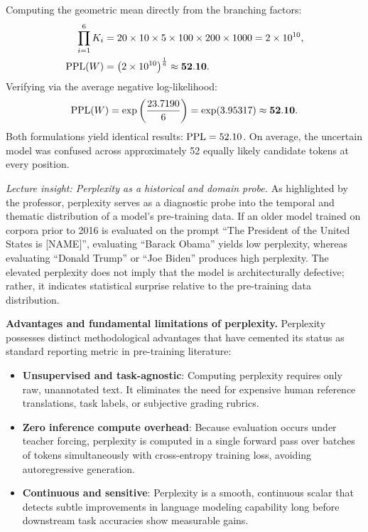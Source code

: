 \documentclass[../../main.tex]{subfiles}
\begin{document}
Computing the geometric mean directly from the branching factors:
\begin{align}
\prod_{i=1}^6 K_i &= 20 \times 10 \times 5 \times 100 \times 200 \times 1000 = 2 \times 10^{10}, \\
\mathrm{PPL}(W) &= \left( 2 \times 10^{10} \right)^{\frac{1}{6}} \approx \mathbf{52.10}.
\end{align}
Verifying via the average negative log-likelihood:
\begin{equation}
\mathrm{PPL}(W) = \exp\left( \frac{23.7190}{6} \right) = \exp(3.95317) \approx \mathbf{52.10}.
\end{equation}
Both formulations yield identical results: $\mathrm{PPL} = 52.10$. On average, the uncertain model was confused across approximately 52 equally likely candidate tokens at every position.

\textit{Lecture insight: Perplexity as a historical and domain probe.} As highlighted by the professor, perplexity serves as a diagnostic probe into the temporal and thematic distribution of a model's pre-training data. If an older model trained on corpora prior to 2016 is evaluated on the prompt ``The President of the United States is [NAME]'', evaluating ``Barack Obama'' yields low perplexity, whereas evaluating ``Donald Trump'' or ``Joe Biden'' produces high perplexity. The elevated perplexity does not imply that the model is architecturally defective; rather, it indicates statistical surprise relative to the pre-training data distribution.

\noindent\textbf{Advantages and fundamental limitations of perplexity.}\newline
Perplexity possesses distinct methodological advantages that have cemented its status as standard reporting metric in pre-training literature:
\begin{itemize}
    \item \textbf{Unsupervised and task-agnostic}: Computing perplexity requires only raw, unannotated text. It eliminates the need for expensive human reference translations, task labels, or subjective grading rubrics.
    \item \textbf{Zero inference compute overhead}: Because evaluation occurs under teacher forcing, perplexity is computed in a single forward pass over batches of tokens simultaneously with cross-entropy training loss, avoiding autoregressive generation.
    \item \textbf{Continuous and sensitive}: Perplexity is a smooth, continuous scalar that detects subtle improvements in language modeling capability long before downstream task accuracies show measurable gains.
\end{itemize}
\end{document}

